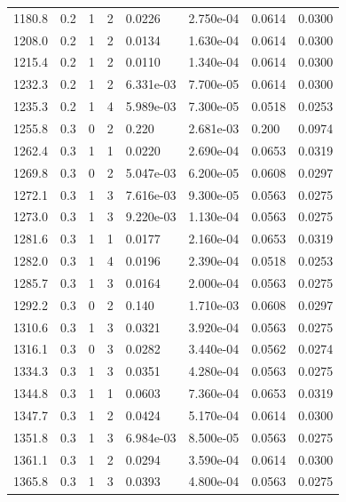 \documentclass[preview]{standalone}
\begin{document}
{{{\begin{tabular}{L{1.2cm}C{1.2cm} C{0.3cm}C{0.5cm} C{1.4cm}C{1.4cm} C{1.4cm}C{1.4cm}}
  1180.8  &   0.2  & 1     &  2 &  0.0226  & 2.750e-04  & 0.0614 &  0.0300   \\ 
  1208.0  &   0.2  & 1     &  2 &  0.0134  & 1.630e-04  & 0.0614 &  0.0300   \\ 
  1215.4  &   0.2  & 1     &  2 &  0.0110  & 1.340e-04  & 0.0614 &  0.0300   \\ 
  1232.3  &   0.2  & 1     &  2 &  6.331e-03  & 7.700e-05  & 0.0614 &  0.0300   \\ 
  1235.3  &   0.2  & 1     &  4 &  5.989e-03  & 7.300e-05  & 0.0518 &  0.0253   \\ 
  1255.8  &   0.3  & 0     &  2 &  0.220  & 2.681e-03  & 0.200 &  0.0974   \\ 
  1262.4  &   0.3  & 1     &  1 &  0.0220  & 2.690e-04  & 0.0653 &  0.0319   \\ 
  1269.8  &   0.3  & 0     &  2 &  5.047e-03  & 6.200e-05  & 0.0608 &  0.0297   \\ 
  1272.1  &   0.3  & 1     &  3 &  7.616e-03  & 9.300e-05  & 0.0563 &  0.0275   \\ 
  1273.0  &   0.3  & 1     &  3 &  9.220e-03  & 1.130e-04  & 0.0563 &  0.0275   \\ 
  1281.6  &   0.3  & 1     &  1 &  0.0177  & 2.160e-04  & 0.0653 &  0.0319   \\ 
  1282.0  &   0.3  & 1     &  4 &  0.0196  & 2.390e-04  & 0.0518 &  0.0253   \\ 
  1285.7  &   0.3  & 1     &  3 &  0.0164  & 2.000e-04  & 0.0563 &  0.0275   \\ 
  1292.2  &   0.3  & 0     &  2 &  0.140  & 1.710e-03  & 0.0608 &  0.0297   \\ 
  1310.6  &   0.3  & 1     &  3 &  0.0321  & 3.920e-04  & 0.0563 &  0.0275   \\ 
  1316.1  &   0.3  & 0     &  3 &  0.0282  & 3.440e-04  & 0.0562 &  0.0274   \\ 
  1334.3  &   0.3  & 1     &  3 &  0.0351  & 4.280e-04  & 0.0563 &  0.0275   \\ 
  1344.8  &   0.3  & 1     &  1 &  0.0603  & 7.360e-04  & 0.0653 &  0.0319   \\ 
  1347.7  &   0.3  & 1     &  2 &  0.0424  & 5.170e-04  & 0.0614 &  0.0300   \\ 
  1351.8  &   0.3  & 1     &  3 &  6.984e-03  & 8.500e-05  & 0.0563 &  0.0275   \\ 
  1361.1  &   0.3  & 1     &  2 &  0.0294  & 3.590e-04  & 0.0614 &  0.0300   \\ 
  1365.8  &   0.3  & 1     &  3 &  0.0393  & 4.800e-04  & 0.0563 &  0.0275   \\ 

\end{tabular}}}}
\end{document}
